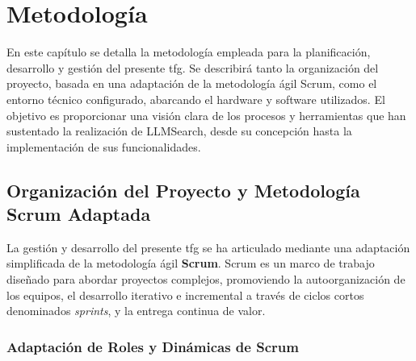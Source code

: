 
\chapter{Metodología}
\label{metodologia}

En este capítulo se detalla la metodología empleada para la planificación, desarrollo y gestión del presente \gls{tfg}. Se describirá tanto la organización del proyecto, basada en una adaptación de la metodología ágil Scrum, como el entorno técnico configurado, abarcando el hardware y software utilizados. El objetivo es proporcionar una visión clara de los procesos y herramientas que han sustentado la realización de LLMSearch, desde su concepción hasta la implementación de sus funcionalidades.

\section{Organización del Proyecto y Metodología Scrum Adaptada}
\label{sec:organizacion_proyecto}

La gestión y desarrollo del presente \gls{tfg} se ha articulado mediante una adaptación simplificada de la metodología ágil \textbf{Scrum}. Scrum es un marco de trabajo diseñado para abordar proyectos complejos, promoviendo la autoorganización de los equipos, el desarrollo iterativo e incremental a través de ciclos cortos denominados \textit{sprints}, y la entrega continua de valor.

\subsection{Adaptación de Roles y Dinámicas de Scrum}
\label{subsec:roles_scrum}

